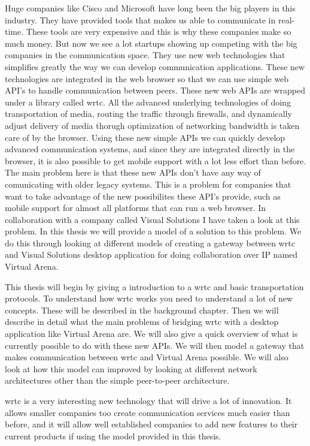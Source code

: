 Huge companies like Cisco and Microsoft have long been the big players in this industry. They have provided tools that makes us able to communicate in real-time. These tools are very expensive and this is why these companies make so much money. But now we see a lot startups showing up competing with the big companies in the communication space. They use new web technologies that simplifies greatly the way we can develop communication applications. These new technologies are integrated in the web browser so that we can use simple web API's to handle communication between peers. These new web APIs are wrapped under a library called \gls{wrtc}. All the advanced underlying technologies of doing transportation of media, routing the traffic through firewalls, and dynamically adjust delivery of media thorugh optimization of networking bandwidth is taken care of by the browser. Using these new simple APIs we can quickly develop advanced communication systems, and since they are integrated directly in the browser, it is also possible to get mobile support with a lot less effort than before. The main problem here is that these new APIs don't have any way of comunicating with older legacy systems. This is a problem for companies that want to take advantage of the new possibilites these API's provide, such as mobile support for almost all platforms that can run a web browser. In collaboration with a company called Visual Solutions I have taken a look at this problem. In this thesis we will provide a model of a solution to this problem. We do this through looking at different models of creating a gateway between \gls{wrtc} and Visual Solutions desktop application for doing collaboration over IP named Virtual Arena.

This thesis will begin by giving a introduction to a \gls{wrtc} and basic transportation protocols. To understand how \gls{wrtc} works you need to understand a lot of new concepts. These will be described in the background chapter. Then we will describe in detail what the main problems of bridging \gls{wrtc} with a desktop application like Virtual Arena are. We will also give a quick overview of what is currently possible to do with these new APIs. We will then model a gateway that makes communication between \gls{wrtc} and Virtual Arena possible. We will also look at how this model can improved by looking at different network architectures other than the simple peer-to-peer architecture.

\gls{wrtc} is a very interesting new technology that will drive a lot of innovation. It allows smaller companies too create communication services much easier than before, and it will allow well established companies to add new features to their current products if using the model provided in this thesis.